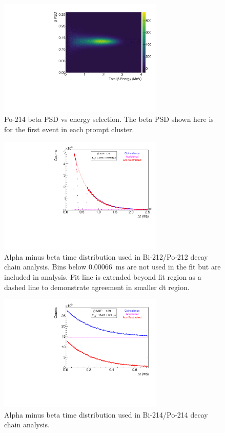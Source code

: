 \begin{figure}[!b]
\centering
\includegraphics[width=0.7\textwidth]{figures/BiPo214BetaPSDvsE.pdf}
\caption{\label{fig:bpsd214}Po-214 beta PSD vs energy selection. The beta PSD shown here is for the first event in each prompt cluster.}
\end{figure}
\begin{figure}[!b]
\centering
\includegraphics[width=0.7\textwidth]{figures/BiPo212DeltaTSpectrum.pdf}
\caption{\label{fig:dt212}Alpha minus beta time distribution used in Bi-212/Po-212 decay chain analysis. Bins below 0.00066~ms are not used in the fit but are included in analysis. Fit line is extended beyond fit region as a dashed line to demonstrate agreement in smaller dt region. }
\end{figure}

\begin{figure}[!bp]
\centering
\includegraphics[width=0.7\textwidth]{figures/BiPo214DeltaTSpectrum.pdf}
\caption{\label{fig:dt214}Alpha minus beta time distribution used in Bi-214/Po-214 decay chain analysis.}
\end{figure}
\clearpage
\newpage

